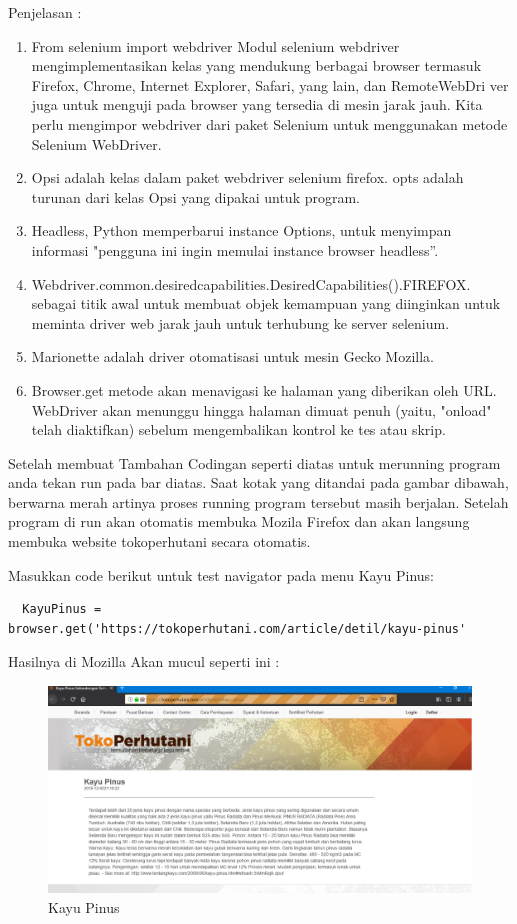 Penjelasan : 
\begin{enumerate}
    \item From selenium import webdriver Modul selenium webdriver mengimplementasikan kelas yang mendukung berbagai browser termasuk Firefox, Chrome, Internet Explorer, Safari, yang lain, dan RemoteWebDri	ver juga untuk menguji pada browser yang tersedia di mesin jarak jauh. Kita perlu mengimpor webdriver dari paket Selenium untuk menggunakan metode Selenium WebDriver.
    \item Opsi adalah kelas dalam paket webdriver selenium firefox. opts adalah turunan dari kelas Opsi yang dipakai untuk program.
    \item Headless, Python memperbarui instance Options, untuk menyimpan informasi "pengguna ini ingin memulai instance browser headless”.
    \item Webdriver.common.desiredcapabilities.DesiredCapabilities().FIREFOX.   sebagai titik awal untuk membuat objek kemampuan yang diinginkan untuk meminta driver web jarak jauh untuk terhubung ke server selenium.  
    \item Marionette adalah driver otomatisasi untuk mesin Gecko Mozilla.
    \item Browser.get metode akan menavigasi ke halaman yang diberikan oleh URL. WebDriver akan menunggu hingga halaman dimuat penuh (yaitu, "onload" telah diaktifkan) sebelum mengembalikan kontrol ke tes atau skrip.
\end{enumerate}

Setelah membuat Tambahan Codingan  seperti diatas untuk merunning program anda tekan run pada bar diatas. Saat kotak yang ditandai pada gambar dibawah, berwarna merah artinya proses running program tersebut masih berjalan. Setelah program di run akan otomatis membuka Mozila Firefox dan akan langsung membuka website tokoperhutani secara otomatis.

Masukkan code berikut untuk test navigator pada menu Kayu Pinus:

\begin{verbatim}
  KayuPinus = browser.get('https://tokoperhutani.com/article/detil/kayu-pinus'
\end{verbatim}

Hasilnya  di Mozilla Akan mucul seperti ini :
\begin{figure}[h]
\centering
\includegraphics[scale=0.3]{figures/1.2}
\caption{Kayu Pinus}
\end{figure}

